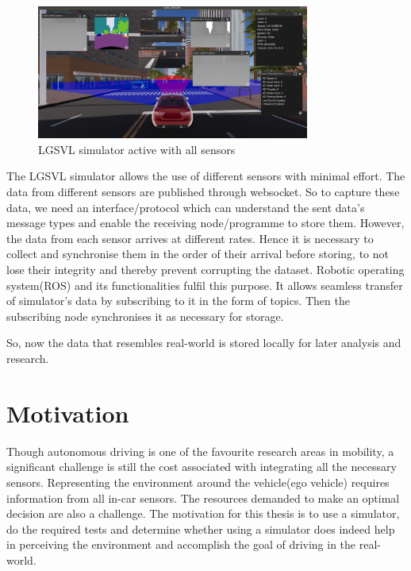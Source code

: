 \begin{figure}[h]
    \begin{center}
        \includegraphics[width = 0.8\textwidth]{figures/png/intro/LGSVL_2_scrot_2020-08-26_20-46-55.png}
    \end{center}
    \caption{LGSVL\cite{LGSVL} simulator active with all sensors}
        \label{fig:LGSVL_constellation_sensors}
\end{figure}

The LGSVL simulator allows the use of different sensors with minimal effort. The data
from different sensors are published through websocket. So to capture these data, we
need an interface/protocol which can understand the sent data's message types and enable the
receiving node/programme to store them. However, the data from each sensor arrives at
different rates. Hence it is necessary to collect and synchronise them in the order of their arrival
before storing, to not lose their integrity and thereby prevent corrupting the dataset.
Robotic operating system(ROS) \cite{ROS2} and its functionalities fulfil
this purpose. It allows seamless transfer of simulator's data by subscribing to it in the
form of topics. Then the subscribing node synchronises it as necessary for storage.

So, now the data that resembles real-world is stored locally for later analysis and
research.


\section{Motivation}

Though autonomous driving is one of the favourite research areas in mobility,
a significant challenge is still the cost associated with integrating all the necessary sensors.
Representing the environment around the vehicle(ego vehicle) requires information from all in-car sensors.
The resources demanded to make an optimal decision are also a challenge. The motivation for this thesis is
to use a simulator, do the required tests and
determine whether using a simulator does indeed help in perceiving the environment
and accomplish the goal of driving in the real-world.

